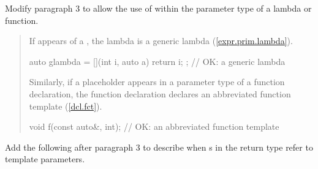 Modify paragraph 3 to allow the use of  within the 
parameter type of a lambda or function.

\begin{quote}
\pnum
If  
appears  
 of a , the lambda 
is a generic lambda
(\ref{expr.prim.lambda}).
%
\enterexample
\begin{codeblock}
auto glambda = [](int i, auto a) { return i; }; // OK: a generic lambda
\end{codeblock}
\exitexample
%
\begin{addedblock}
Similarly, if a placeholder appears in a parameter type of a function 
declaration, the function declaration declares an abbreviated function 
template (\ref{dcl.fct}).
%
\enterexample
\begin{codeblock}
void f(const auto&, int); // OK: an abbreviated function template
\end{codeblock}
\exitexample
\end{addedblock}
\end{quote}


Add the following after paragraph 3 to describe when 
s in the return type 
refer to template parameters.

